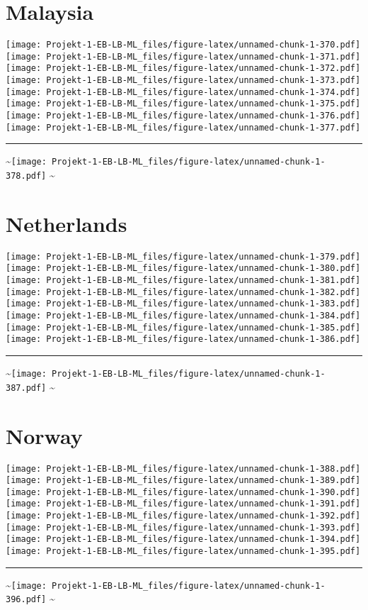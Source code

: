 \documentclass[]{article}
\begin{document}
\section{Malaysia}\label{malaysia}

\texttt{[image: Projekt-1-EB-LB-ML\_files/figure-latex/unnamed-chunk-1-370.pdf]}
\texttt{[image: Projekt-1-EB-LB-ML\_files/figure-latex/unnamed-chunk-1-371.pdf]}
\texttt{[image: Projekt-1-EB-LB-ML\_files/figure-latex/unnamed-chunk-1-372.pdf]}
\texttt{[image: Projekt-1-EB-LB-ML\_files/figure-latex/unnamed-chunk-1-373.pdf]}
\texttt{[image: Projekt-1-EB-LB-ML\_files/figure-latex/unnamed-chunk-1-374.pdf]}
\texttt{[image: Projekt-1-EB-LB-ML\_files/figure-latex/unnamed-chunk-1-375.pdf]}
\texttt{[image: Projekt-1-EB-LB-ML\_files/figure-latex/unnamed-chunk-1-376.pdf]}
\texttt{[image: Projekt-1-EB-LB-ML\_files/figure-latex/unnamed-chunk-1-377.pdf]}
\bigskip\hrule\bigskip
\textasciitilde{}\hfill\texttt{[image: Projekt-1-EB-LB-ML\_files/figure-latex/unnamed-chunk-1-378.pdf]}
\hfill \textasciitilde{} \vfill\eject

\section{Netherlands}\label{netherlands}

\texttt{[image: Projekt-1-EB-LB-ML\_files/figure-latex/unnamed-chunk-1-379.pdf]}
\texttt{[image: Projekt-1-EB-LB-ML\_files/figure-latex/unnamed-chunk-1-380.pdf]}
\texttt{[image: Projekt-1-EB-LB-ML\_files/figure-latex/unnamed-chunk-1-381.pdf]}
\texttt{[image: Projekt-1-EB-LB-ML\_files/figure-latex/unnamed-chunk-1-382.pdf]}
\texttt{[image: Projekt-1-EB-LB-ML\_files/figure-latex/unnamed-chunk-1-383.pdf]}
\texttt{[image: Projekt-1-EB-LB-ML\_files/figure-latex/unnamed-chunk-1-384.pdf]}
\texttt{[image: Projekt-1-EB-LB-ML\_files/figure-latex/unnamed-chunk-1-385.pdf]}
\texttt{[image: Projekt-1-EB-LB-ML\_files/figure-latex/unnamed-chunk-1-386.pdf]}
\bigskip\hrule\bigskip
\textasciitilde{}\hfill\texttt{[image: Projekt-1-EB-LB-ML\_files/figure-latex/unnamed-chunk-1-387.pdf]}
\hfill \textasciitilde{} \vfill\eject

\section{Norway}\label{norway}

\texttt{[image: Projekt-1-EB-LB-ML\_files/figure-latex/unnamed-chunk-1-388.pdf]}
\texttt{[image: Projekt-1-EB-LB-ML\_files/figure-latex/unnamed-chunk-1-389.pdf]}
\texttt{[image: Projekt-1-EB-LB-ML\_files/figure-latex/unnamed-chunk-1-390.pdf]}
\texttt{[image: Projekt-1-EB-LB-ML\_files/figure-latex/unnamed-chunk-1-391.pdf]}
\texttt{[image: Projekt-1-EB-LB-ML\_files/figure-latex/unnamed-chunk-1-392.pdf]}
\texttt{[image: Projekt-1-EB-LB-ML\_files/figure-latex/unnamed-chunk-1-393.pdf]}
\texttt{[image: Projekt-1-EB-LB-ML\_files/figure-latex/unnamed-chunk-1-394.pdf]}
\texttt{[image: Projekt-1-EB-LB-ML\_files/figure-latex/unnamed-chunk-1-395.pdf]}
\bigskip\hrule\bigskip
\textasciitilde{}\hfill\texttt{[image: Projekt-1-EB-LB-ML\_files/figure-latex/unnamed-chunk-1-396.pdf]}
\hfill \textasciitilde{} \vfill\eject
\end{document}
